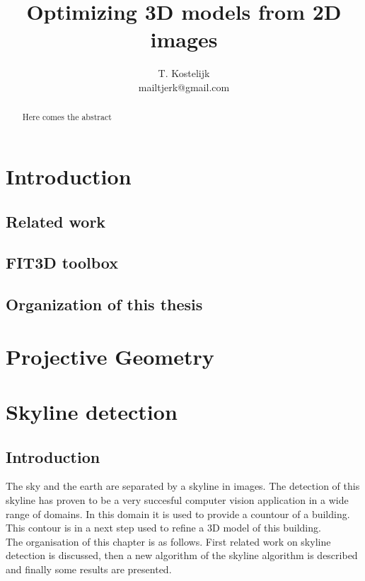 \documentclass[10pt]{article}
\title{\sc Optimizing 3D models from 2D images}
\author{T. Kostelijk\\mailtjerk@gmail.com}
\begin{document}
\maketitle

\begin{abstract}
Here comes the abstract
\end{abstract}





\section{Introduction}
 \subsection{Related work}
 \subsection{FIT3D toolbox}
 \subsection{Organization of this thesis}

\section{Projective Geometry}

\section{Skyline detection}
 \subsection{Introduction}

The sky and the earth are separated by a skyline in images. The detection of this skyline
has proven to be a very succesful computer vision application in a wide range of
domains. In this domain it is used to provide a countour of a building. This
contour is in a next step used to refine a 3D model of this building.\\
The organisation of this chapter is as follows.  First related work on skyline
detection is discussed, then a new algorithm of the skyline algorithm is
described and finally some results are presented.\\
\end{document}
